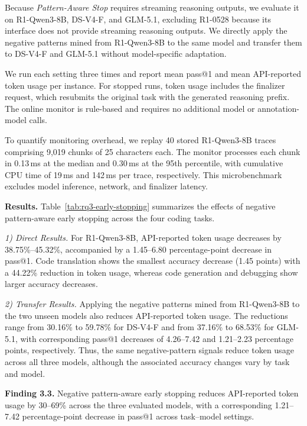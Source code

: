 \documentclass[acmsmall,screen,review,anonymous]{acmart}
\begin{document}
Because \emph{Pattern-Aware Stop} requires streaming reasoning outputs, we evaluate it on R1-Qwen3-8B, DS-V4-F, and GLM-5.1, excluding R1-0528 because its interface does not provide streaming reasoning outputs. We directly apply the negative patterns mined from R1-Qwen3-8B to the same model and transfer them to DS-V4-F and GLM-5.1 without model-specific adaptation.

We run each setting three times and report mean pass@1 and mean API-reported token usage per instance. For stopped runs, token usage includes the finalizer request, which resubmits the original task with the generated reasoning prefix. The online monitor is rule-based and requires no additional model or annotation-model calls.

To quantify monitoring overhead, we replay 40 stored R1-Qwen3-8B traces comprising 9{,}019 chunks of 25 characters each. The monitor processes each chunk in 0.13\,ms at the median and 0.30\,ms at the 95th percentile, with cumulative CPU time of 19\,ms and 142\,ms per trace, respectively. This microbenchmark excludes model inference, network, and finalizer latency.



\textbf{Results.}
Table~\ref{tab:rq3-early-stopping} summarizes the effects of negative pattern-aware early stopping across the four coding tasks.

\textit{1) Direct Results.}
For R1-Qwen3-8B, API-reported token usage decreases by 38.75\%--45.32\%, accompanied by a 1.45--6.80 percentage-point decrease in pass@1. Code translation shows the smallest accuracy decrease (1.45 points) with a 44.22\% reduction in token usage, whereas code generation and debugging show larger accuracy decreases.

\textit{2) Transfer Results.}
Applying the negative patterns mined from R1-Qwen3-8B to the two unseen models also reduces API-reported token usage. The reductions range from 30.16\% to 59.78\% for DS-V4-F and from 37.16\% to 68.53\% for GLM-5.1, with corresponding pass@1 decreases of 4.26--7.42 and 1.21--2.23 percentage points, respectively. 
Thus, the same negative-pattern signals reduce token usage across all three models, although the associated accuracy changes vary by task and model.

\begin{tcolorbox}[width=\linewidth, boxrule=0.8pt, left=2pt, right=2pt, top=2pt, bottom=2pt, colback=gray!10, colframe=black]
\textbf{Finding 3.3.}
Negative pattern-aware early stopping reduces API-reported token usage by 30--69\% across the three evaluated models, with a corresponding 1.21--7.42 percentage-point decrease in pass@1 across task--model settings.
\end{tcolorbox}
\end{document}
